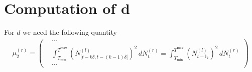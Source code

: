 \documentclass{article}
\newcommand{\be}{\begin{eqnarray*}}
\newcommand{\ee}{\end{eqnarray*}}
\newcommand{\dsp}{\displaystyle}
\def\Ik{\mathbb{I}_k}
\def\Tmin{T_{\min}}
\def\Tmax{T^{\max}}
\begin{document}
\section{Computation of d}
For $d$ we need the following quantity
\be
\mu_2^{(r)} = \left(
\begin{array}{ll}
  &\cdots\\
&\dsp\int_{\Tmin}^{\Tmax}\left(N^{(l)}_{[t-k\delta,t-(k-1)\delta[}\right)^2\,dN^{(r)}_t = \dsp\int_{\Tmin}^{\Tmax}(N^{(l)}_{t-\Ik})^2\,dN^{(r)}_t \\
  &\cdots
\end{array}
\right)
\ee
\end{document}
